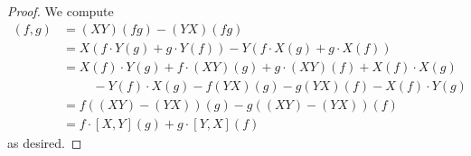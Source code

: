 \begin{proof}
    We compute 
    \begin{align*}
        [X,Y](f,g) &= (XY)(fg) - (YX)(fg) \\
        &= X(f\cdot Y(g)+g\cdot Y(f)) - Y(f\cdot X(g)+ g\cdot X(f)) \\
        &= X(f)\cdot Y(g) + f\cdot (XY)(g) + g\cdot (XY)(f) + X(f)\cdot X(g) \\
        &\hspace{1cm}-Y(f)\cdot X(g) - f(YX)(g) - g(YX)(f) - X(f)\cdot Y(g)\\
        &= f((XY)-(YX))(g)-g((XY)-(YX))(f) \\
        &= f\cdot [X,Y](g) + g\cdot [Y,X](f)
    \end{align*}
    as desired. 
\end{proof}